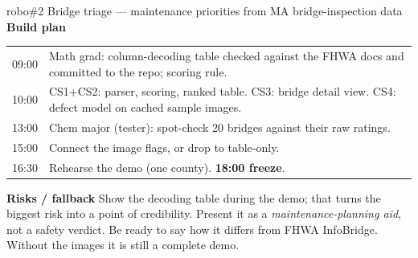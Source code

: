 \documentclass[11pt]{article}
\newcommand{\field}[1]{\textbf{\textsf{#1}}\quad}
\begin{document}
\begin{ideacard}{robo}{\#2 \quad Bridge triage --- maintenance priorities from MA bridge-inspection data}
\field{Build plan}\par\nopagebreak
\begin{tabularx}{\linewidth}{@{}L{1.2cm} X@{}}
09:00 & Math grad: column-decoding table checked against the FHWA docs and committed to the repo; scoring rule.\\
10:00 & CS1+CS2: parser, scoring, ranked table. CS3: bridge detail view. CS4: defect model on cached sample images.\\
13:00 & Chem major (tester): spot-check 20 bridges against their raw ratings.\\
15:00 & Connect the image flags, or drop to table-only.\\
16:30 & Rehearse the demo (one county). \textbf{18:00 freeze}.\\
\end{tabularx}

\field{Risks / fallback} Show the decoding table during the demo; that turns the biggest risk
into a point of credibility. Present it as a \emph{maintenance-planning aid}, not a safety
verdict. Be ready to say how it differs from FHWA InfoBridge. Without the images it is still
a complete demo.
\end{ideacard}
\end{document}
